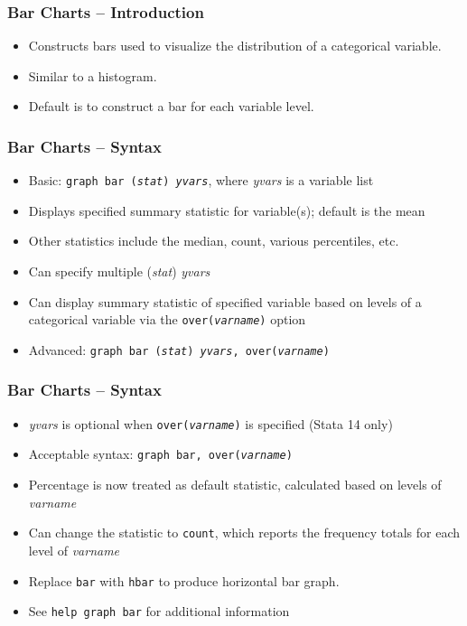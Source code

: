 \documentclass{beamer}
\begin{document}
\begin{frame}
	\frametitle{Bar Charts -- Introduction}
	
	\begin{itemize}
		\item Constructs bars used to visualize the distribution of a categorical variable.
		\item Similar to a histogram.
		\item Default is to construct a bar for each variable level.
	\end{itemize}
\end{frame}

\begin{frame}
	\frametitle{Bar Charts -- Syntax}
	
	\begin{itemize}
		\item Basic: \texttt{graph bar (\textit{stat}) \textit{yvars}}, where \textit{yvars} is a variable list
		\item Displays specified summary statistic for variable(s); default is the mean
		\item Other statistics include the median, count, various percentiles, etc.
		\item Can specify multiple (\textit{stat}) \textit{yvars}
		\item Can display summary statistic of specified variable based on levels of a categorical variable via the \texttt{over(\textit{varname})} option
		\item Advanced: \texttt{graph bar (\textit{stat}) \textit{yvars}, over(\textit{varname})}
	\end{itemize}
\end{frame}

\begin{frame}
	\frametitle{Bar Charts -- Syntax}
	
	\begin{itemize}
		\item \textit{yvars} is optional when \texttt{over(\textit{varname})} is specified (Stata 14 only)
		\item Acceptable syntax: \texttt{graph bar, over(\textit{varname})}
		\item Percentage is now treated as default statistic, calculated based on levels of \textit{varname}
		\item Can change the statistic to \texttt{count}, which reports the frequency totals for each level of \textit{varname}
		\item Replace \texttt{bar} with \texttt{hbar} to produce horizontal bar graph.
		\item See \texttt{help graph bar} for additional information
	\end{itemize}
\end{frame}
\end{document}
